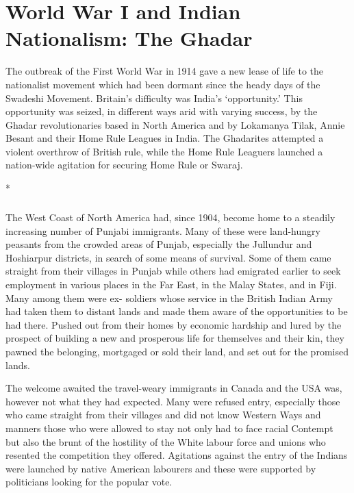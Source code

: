 
\chapter{World War I and Indian Nationalism: The Ghadar}

The outbreak of the First World War in 1914 gave a new lease of life to the nationalist movement which had been dormant since the heady days of the Swadeshi Movement. Britain's difficulty was India's `opportunity.' This opportunity was seized, in different ways arid with varying success, by the Ghadar revolutionaries based in North America and by Lokamanya Tilak, Annie Besant and their Home Rule Leagues in India. The Ghadarites attempted a violent overthrow of British rule, while the Home Rule Leaguers launched a nation-wide agitation for securing Home Rule or Swaraj.

\begin{center}*\end{center}

\paragraph*{}

The West Coast of North America had, since 1904, become home to a steadily increasing number of Punjabi immigrants. Many of these were land-hungry peasants from the crowded areas of Punjab, especially the Jullundur and Hoshiarpur districts, in search of some means of survival. Some of them came straight from their villages in Punjab while others had emigrated earlier to seek employment in various places in the Far East, in the Malay States, and in Fiji. Many among them were ex- soldiers whose service in the British Indian Army had taken them to distant lands and made them aware of the opportunities to be had there. Pushed out from their homes by economic hardship and lured by the prospect of building a new and prosperous life for themselves and their kin, they pawned the belonging, mortgaged or sold their land, and set out for the promised lands.

The welcome awaited the travel-weary immigrants in Canada and the USA was, however not what they had expected. Many were refused entry, especially those who came straight from their villages and did not know Western Ways and manners those who were allowed to stay not only had to face racial Contempt but also the brunt of the hostility of the White labour force and unions who resented the competition they offered. Agitations against the entry of the Indians were launched by native American labourers and these were supported by politicians looking for the popular vote.

